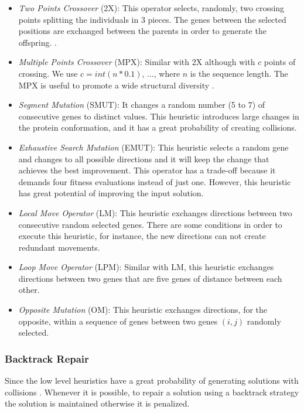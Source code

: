 \documentclass[conference]{IEEEtran}
\begin{document}
  \begin{itemize}
  	\item \textit{Two Points Crossover} (2X): This operator selects, randomly, two crossing points splitting the individuals in 3 pieces. The genes between the selected positions are exchanged between the parents in order to generate the offspring. \cite{benitez2015algoritmo}.
  	
  	
  	\item  \textit{Multiple Points Crossover} (MPX): Similar with 2X although with $c$ points of crossing. We use $c=int(n*0.1)$, ..., where $n$ is the sequence length. The MPX is useful to promote a wide structural diversity \cite{sabar2015automatic}.
  	
	\item \textit{Segment Mutation} (SMUT): It changes a random number (5 to 7) of consecutive genes to distinct values. This heuristic introduces large changes in the protein conformation, and it has a great probability of creating collisions.  

	\item \textit {Exhaustive Search Mutation} (EMUT): This heuristic selects a random gene and changes to all possible directions and it will keep the change that achieves the best improvement. This operator has a trade-off because it demands four fitness evaluations instead of just one. However, this heuristic has great potential of improving the input solution.
	
	\item \textit{Local Move Operator} (LM): This heuristic exchanges directions between two consecutive random selected genes. There are some conditions in order to execute this heuristic, for instance, the new directions can not create redundant movements. 
	
	\item \textit{Loop Move Operator} (LPM): Similar with LM, this heuristic exchanges directions between two genes that are five genes of distance between each other.
	
	
	\item \textit{Opposite Mutation} (OM): This heuristic exchanges directions, for the opposite, within a sequence of genes between two genes $(i,j)$ randomly selected. 
%	
 \end{itemize} 	 
 
 \subsubsection{Backtrack Repair}
 Since the low level heuristics have a great probability of generating solutions with collisions \cite{benitez2015algoritmo}. Whenever it is possible, to repair a solution using a backtrack strategy the solution is maintained otherwise it is penalized. 
 
\end{document}
